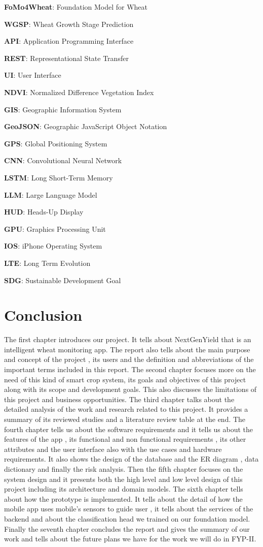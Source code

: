 \documentclass{FastFyp}
\begin{document}
\textbf{FoMo4Wheat}: Foundation Model for Wheat  

\textbf{WGSP}: Wheat Growth Stage Prediction  

\textbf{API}: Application Programming Interface  

\textbf{REST}: Representational State Transfer  

\textbf{UI}: User Interface  

\textbf{NDVI}: Normalized Difference Vegetation Index

\textbf{GIS}: Geographic Information System

\textbf{GeoJSON}: Geographic JavaScript Object Notation

\textbf{GPS}: Global Positioning System

\textbf{CNN}: Convolutional Neural Network

\textbf{LSTM}: Long Short-Term Memory

\textbf{LLM}: Large Language Model

\textbf{HUD}: Heads-Up Display

\textbf{GPU}: Graphics Processing Unit

\textbf{IOS}: iPhone Operating System

\textbf{LTE}: Long Term Evolution

\textbf{SDG}: Sustainable Development Goal

 

 
\section{Conclusion}
The first chapter introduces our project. It tells about NextGenYield that is an intelligent wheat monitoring app. The report also tells about the main purpose and concept of the project , its users and the definition and abbreviations of the important terms included in this report. The second chapter focuses more on the need of this kind of smart crop system, its goals and objectives of this project along with its scope and development goals. This also discusses the limitations of this project and business opportunities. The third chapter talks about the detailed analysis of the work and research related to this project. It provides a summary of its reviewed studies and a literature review table at the end. The fourth chapter tells us about the software requirements and it tells us about the features of the app , its functional and non functional requirements , its other attributes and the user interface also with the use cases and hardware requirements. It also shows the design of the database and the ER diagram , data dictionary and finally the risk analysis. Then the fifth chapter focuses on the system design and it presents both the high level and low level design of this project including its architecture and domain models. The sixth chapter tells about how the prototype is implemented. It tells about the detail of how the mobile app uses mobile's sensors to guide user , it tells about the services of the backend and about the classification head we trained on our foundation model. Finally the seventh chapter concludes the report and gives the summary of our work and tells about the future plans we have for the work we will do in FYP-II.
\end{document}

